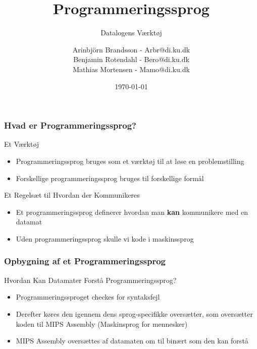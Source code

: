\documentclass[12pt,t]{beamer}
\title{Programmeringssprog}
\subtitle{Datalogens Værktøj}
\author{
        Arinbjörn Brandsson - Arbr@di.ku.dk \\
        Benjamin Rotendahl - Bero@di.ku.dk\\
        Mathias Mortensen - Mamo@di.ku.dk
}
\date[]{\today}
\begin{document}
\frame[nat]{\titlepage}

\begin{frame}
\frametitle{Hvad er Programmeringssprog?}
\begin{block}{Et Værktøj}
\begin{itemize}
\item Programmeringssprog bruges som et værktøj til at løse en problemstilling\\
\item Forskellige programmeringssprog bruges til forskellige formål
\end{itemize}
\end{block}
\begin{block}{Et Regelsæt til Hvordan der Kommunikeres}
\begin{itemize}
\item Et programmeringssprog definerer hvordan man \textbf{kan} kommunikere med 
en datamat\\
\item Uden programmeringssprog skulle vi kode i maskinssprog
\end{itemize}
\end{block}
\end{frame}

\begin{frame}
\frametitle{Opbygning af et Programmeringssprog}
\begin{block}{Hvordan Kan Datamater Forstå Programmeringssprog?}
\begin{itemize}
\item Programmeringssproget checkes for syntaksfejl\\
\item Derefter køres den igennem dens sprog-specifikke oversætter, 
som oversætter koden til MIPS Assembly (Maskinsprog for mennesker)\\
\item MIPS Assembly oversættes af datamaten om til binært som den kan forstå
\end{itemize}
\end{block}
\end{frame}
\end{document}
